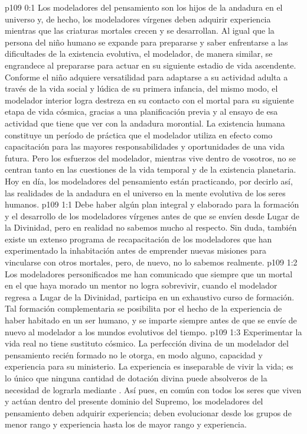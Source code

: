 \author{Mensajero solitario}
\vs p109 0:1 Los modeladores del pensamiento son los hijos de la andadura en el universo y, de hecho, los modeladores vírgenes deben adquirir experiencia mientras que las criaturas mortales crecen y se desarrollan. Al igual que la persona del niño humano se expande para prepararse y saber enfrentarse a las dificultades de la existencia evolutiva, el modelador, de manera similar, se engrandece al prepararse para actuar en su siguiente estadio de vida ascendente. Conforme el niño adquiere versatilidad para adaptarse a su actividad adulta a través de la vida social y lúdica de su primera infancia, del mismo modo, el modelador interior logra destreza en su contacto con el mortal para su siguiente etapa de vida cósmica, gracias a una planificación previa y al ensayo de esa actividad que tiene que ver con la andadura morontial. La existencia humana constituye un período de práctica que el modelador utiliza en efecto como capacitación para las mayores responsabilidades y oportunidades de una vida futura. Pero los esfuerzos del modelador, mientras vive dentro de vosotros, no se centran tanto en las cuestiones de la vida temporal y de la existencia planetaria. Hoy en día, los modeladores del pensamiento están practicando, por decirlo así, las realidades de la andadura en el universo en la mente evolutiva de los seres humanos.
\vs p109 1:1 Debe haber algún plan integral y elaborado para la formación y el desarrollo de los modeladores vírgenes antes de que se envíen desde Lugar de la Divinidad, pero en realidad no sabemos mucho al respecto. Sin duda, también existe un extenso programa de recapacitación de los modeladores que han experimentado la inhabitación antes de emprender nuevas misiones para vincularse con otros mortales, pero, de nuevo, no lo sabemos realmente.
\vs p109 1:2 Los modeladores personificados me han comunicado que siempre que un mortal en el que haya morado un mentor no logra sobrevivir, cuando el modelador regresa a Lugar de la Divinidad, participa en un exhaustivo curso de formación. Tal formación complementaria se posibilita por el hecho de la experiencia de haber habitado en un ser humano, y se imparte siempre antes de que se envíe de nuevo al modelador a los mundos evolutivos del tiempo.
\vs p109 1:3 Experimentar la vida real no tiene sustituto cósmico. La perfección divina de un modelador del pensamiento recién formado no le otorga, en modo alguno, capacidad y experiencia para su ministerio. La experiencia es inseparable de vivir la vida; es lo único que ninguna cantidad de dotación divina puede absolveros de la necesidad de lograrla mediante . Así pues, en común con todos los seres que viven y actúan dentro del presente dominio del Supremo, los modeladores del pensamiento deben adquirir experiencia; deben evolucionar desde los grupos de menor rango y experiencia hasta los de mayor rango y experiencia.
